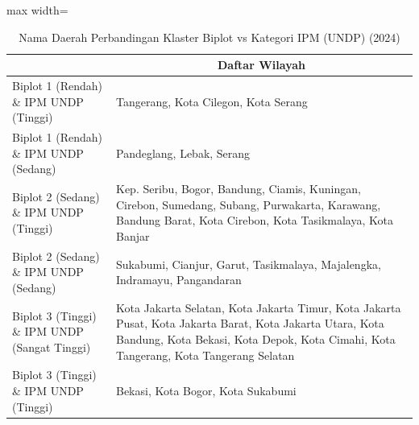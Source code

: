 \begin{table}[H]
\centering
\caption{Nama Daerah Perbandingan Klaster Biplot vs Kategori IPM (UNDP) (2024)} \label{tab:app2crossname2024}
\begin{adjustbox}{max width=\textwidth}
\begin{tabular}{|>{\centering\arraybackslash}p{4cm}|p{10cm}|}
\hline
\multicolumn{1}{|c|}{\textbf{Kategori}} & \multicolumn{1}{c|}{\textbf{Daftar Wilayah}} \\
\hline
Biplot 1 (Rendah) \& IPM UNDP (Tinggi) & Tangerang, Kota Cilegon, Kota Serang \\
\hline
Biplot 1 (Rendah) \& IPM UNDP (Sedang) & Pandeglang, Lebak, Serang \\
\hline
Biplot 2 (Sedang) \& IPM UNDP (Tinggi) & Kep. Seribu, Bogor, Bandung, Ciamis, Kuningan, Cirebon, Sumedang, Subang, Purwakarta, Karawang, Bandung Barat, Kota Cirebon, Kota Tasikmalaya, Kota Banjar \\
\hline
Biplot 2 (Sedang) \& IPM UNDP (Sedang) & Sukabumi, Cianjur, Garut, Tasikmalaya, Majalengka, Indramayu, Pangandaran \\
\hline
Biplot 3 (Tinggi) \& IPM UNDP (Sangat Tinggi) & Kota Jakarta Selatan, Kota Jakarta Timur, Kota Jakarta Pusat, Kota Jakarta Barat, Kota Jakarta Utara, Kota Bandung, Kota Bekasi, Kota Depok, Kota Cimahi, Kota Tangerang, Kota Tangerang Selatan \\
\hline
Biplot 3 (Tinggi) \& IPM UNDP (Tinggi) & Bekasi, Kota Bogor, Kota Sukabumi \\
\hline
\end{tabular}
\end{adjustbox}
\end{table}